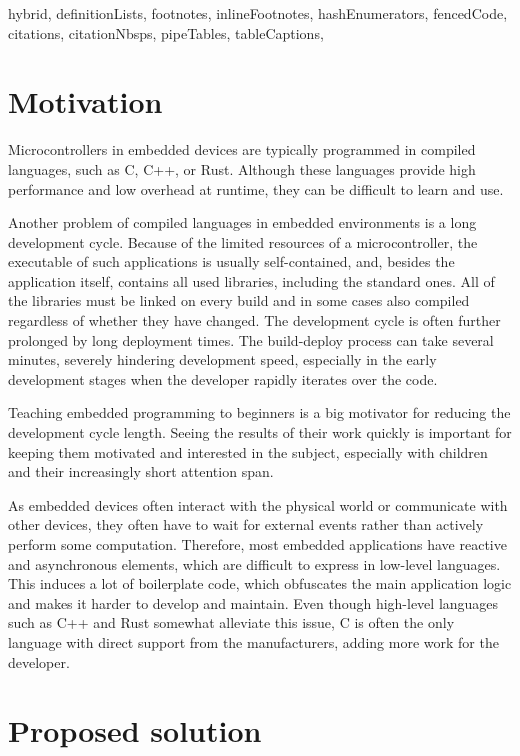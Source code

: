 \begin{markdown*}{%
  hybrid,
  definitionLists,
  footnotes,
  inlineFootnotes,
  hashEnumerators,
  fencedCode,
  citations,
  citationNbsps,
  pipeTables,
  tableCaptions,
}

\chapter{Motivation}

Microcontrollers in embedded devices are typically programmed in compiled languages, such as C, C++, or Rust. Although these languages provide high performance and low overhead at runtime, they can be difficult to learn and use.

Another problem of compiled languages in embedded environments is a long development cycle. Because of the limited resources of a microcontroller, the executable of such applications is usually self-contained, and, besides the application itself, contains all used libraries, including the standard ones. All of the libraries must be linked on every build and in some cases also compiled regardless of whether they have changed. The development cycle is often further prolonged by long deployment times. The build-deploy process can take several minutes, severely hindering development speed, especially in the early development stages when the developer rapidly iterates over the code.

Teaching embedded programming to beginners is a big motivator for reducing the development cycle length. Seeing the results of their work quickly is important for keeping them motivated and interested in the subject, especially with children and their increasingly short attention span.

As embedded devices often interact with the physical world or communicate with other devices, they often have to wait for external events rather than actively perform some computation. Therefore, most embedded applications have reactive and asynchronous elements, which are difficult to express in low-level languages. This induces a lot of boilerplate code, which obfuscates the main application logic and makes it harder to develop and maintain. Even though high-level languages such as C++ and Rust somewhat alleviate this issue, C is often the only language with direct support from the manufacturers, adding more work for the developer.


\chapter{Proposed solution}


\end{markdown*}
